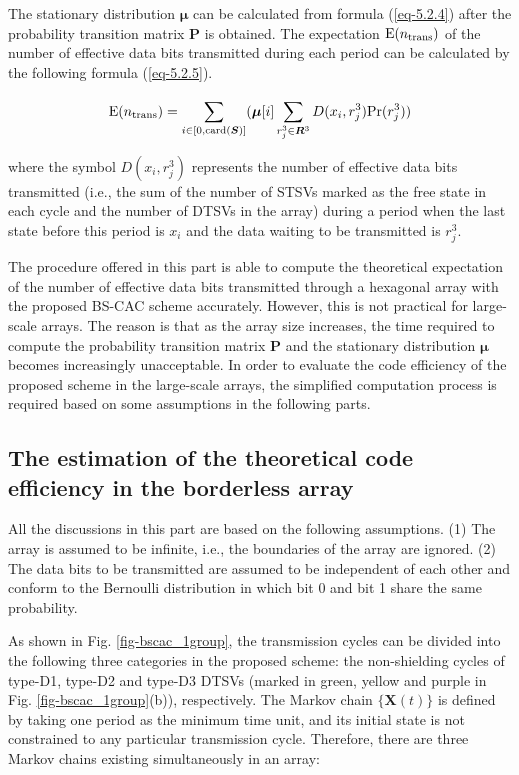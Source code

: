 \documentclass[lettersize,journal]{IEEEtran}
\begin{document}
The stationary distribution $\boldsymbol{\mu}$ can be calculated from formula (\ref{eq-5.2.4}) after the probability transition matrix $\boldsymbol{P}$ is obtained. The expectation ${\rm E}(n_{\rm trans})$ of the number of effective data bits transmitted during each period can be calculated by the following formula (\ref{eq-5.2.5}).

\begin{equation}
	{\rm E}(n_{\rm trans}) = \sum_{i\in [0, {\rm card}(\boldsymbol{S})]}^{} (\boldsymbol{\mu}[i] \sum_{r_j^3 \in \boldsymbol{R}^3}^{} D(x_i,r_j^3) {\rm Pr}(r_j^3))
	\label{eq-5.2.5}
\end{equation}

\noindent where the symbol $D(x_i,r_j^3)$ represents the number of effective data bits transmitted (i.e., the sum of the number of STSVs marked as the free state in each cycle and the number of DTSVs in the array) during a period when the last state before this period is $x_i$ and the data waiting to be transmitted is $r_j^3$.

The procedure offered in this part is able to compute the theoretical expectation of the number of effective data bits transmitted through a hexagonal array with the proposed BS-CAC scheme accurately. However, this is not practical for large-scale arrays. The reason is that as the array size increases, the time required to compute the probability transition matrix $\boldsymbol{P}$ and the stationary distribution $\boldsymbol{\mu}$ becomes increasingly unacceptable. In order to evaluate the code efficiency of the proposed scheme in the large-scale arrays, the simplified computation process is required based on some assumptions in the following parts. 

\subsection{The estimation of the theoretical code efficiency in the borderless array}\label{subsec-code_rate-esti_borderless}
All the discussions in this part are based on the following assumptions.
(1) The array is assumed to be infinite, i.e., the boundaries of the array are ignored.
(2) The data bits to be transmitted are assumed to be independent of each other and conform to the Bernoulli distribution in which bit 0 and bit 1 share the same probability.

As shown in Fig. \ref{fig-bscac_1group}, the transmission cycles can be divided into the following three categories in the proposed scheme: the non-shielding cycles of type-D1, type-D2 and type-D3 DTSVs (marked in green, yellow and purple in Fig. \ref{fig-bscac_1group}(b)), respectively. The Markov chain $\{\boldsymbol{X}(t)\}$ is defined by taking one period as the minimum time unit, and its initial state is not constrained to any particular transmission cycle. Therefore, there are three Markov chains existing simultaneously in an array:
\end{document}

